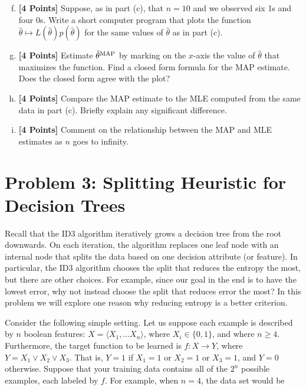 \documentclass{article}
\newcommand \map [1]{{\hat #1}^{\rm MAP}}
\begin{document}
\begin{enumerate}[(a)]
  \setcounter{enumi}{5}
\item {\bf [4 Points]} Suppose, as in part (c), that $n = 10$ and we
  observed six 1s and four 0s. Write a short computer program that
  plots the function
  $\hat \theta \mapsto L(\hat \theta)p(\hat \theta)$ for the same
  values of $\hat \theta$ as in part (c).

\item {\bf [4 Points]} Estimate $\map{\theta}$ by marking on the
  $x$-axis the value of $\hat \theta$ that maximizes the
  function. Find a closed form formula for the MAP estimate. Does the
  closed form agree with the plot?

\item {\bf [4 Points]} Compare the MAP estimate to the MLE computed
  from the same data in part (c). Briefly explain any significant
  difference.

\item {\bf [4 Points]} Comment on the relationship between the MAP and
  MLE estimates as $n$ goes to infinity.

\end{enumerate}

\section*{Problem 3: Splitting Heuristic for Decision Trees}

Recall that the ID3 algorithm iteratively grows a decision tree from
the root downwards. On each iteration, the algorithm replaces one leaf
node with an internal node that splits the data based on one decision
attribute (or feature). In particular, the ID3 algorithm chooses the
split that reduces the entropy the most, but there are other
choices. For example, since our goal in the end is to have the lowest
error, why not instead choose the split that reduces error the most?
In this problem we will explore one reason why reducing entropy is a
better criterion. 

Consider the following simple setting.  Let us suppose each example is
described by $n$ boolean features:
$X = \langle X_1, \ldots X_n \rangle$, where $X_i \in \{0,1\}$, and
where $n \geq 4$.  Furthermore, the target function to be learned is
$f: X \rightarrow Y$, where $Y = X_1 \vee X_2 \vee X_3$. That is,
$Y= 1$ if $X_1=1$ or $X_2 = 1$ or $X_3 = 1$, and $Y = 0$
otherwise. Suppose that your training data contains all of the $2^n$
possible examples, each labeled by $f$. For example, when $n = 4$, the
data set would be
\end{document}
